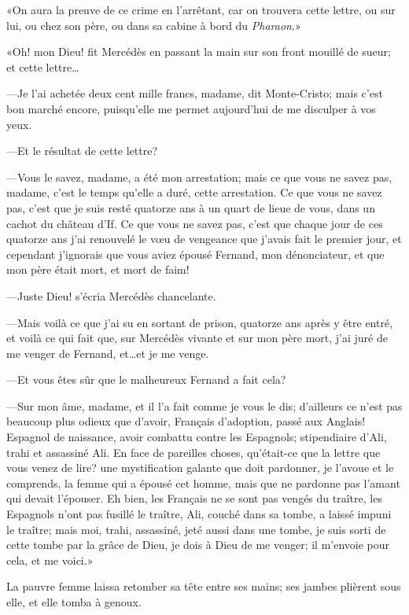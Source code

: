 «On aura la preuve de ce crime en l'arrêtant, car on trouvera cette lettre, ou sur lui, ou chez son père, ou dans sa cabine à bord du \textit{Pharaon}.» 

«Oh! mon Dieu! fit Mercédès en passant la main sur son front mouillé de sueur; et cette lettre\dots 

—Je l'ai achetée deux cent mille francs, madame, dit Monte-Cristo; mais c'est bon marché encore, puisqu'elle me permet aujourd'hui de me disculper à vos yeux. 

—Et le résultat de cette lettre? 

—Vous le savez, madame, a été mon arrestation; mais ce que vous ne savez pas, madame, c'est le temps qu'elle a duré, cette arrestation. Ce que vous ne savez pas, c'est que je suis resté quatorze ans à un quart de lieue de vous, dans un cachot du château d'If. Ce que vous ne savez pas, c'est que chaque jour de ces quatorze ans j'ai renouvelé le vœu de vengeance que j'avais fait le premier jour, et cependant j'ignorais que vous aviez épousé Fernand, mon dénonciateur, et que mon père était mort, et mort de faim! 

—Juste Dieu! s'écria Mercédès chancelante. 

—Mais voilà ce que j'ai su en sortant de prison, quatorze ans après y être entré, et voilà ce qui fait que, sur Mercédès vivante et sur mon père mort, j'ai juré de me venger de Fernand, et\dots et je me venge. 

—Et vous êtes sûr que le malheureux Fernand a fait cela? 

—Sur mon âme, madame, et il l'a fait comme je vous le dis; d'ailleurs ce n'est pas beaucoup plus odieux que d'avoir, Français d'adoption, passé aux Anglais! Espagnol de naissance, avoir combattu contre les Espagnols; stipendiaire d'Ali, trahi et assassiné Ali. En face de pareilles choses, qu'était-ce que la lettre que vous venez de lire? une mystification galante que doit pardonner, je l'avoue et le comprends, la femme qui a épousé cet homme, mais que ne pardonne pas l'amant qui devait l'épouser. Eh bien, les Français ne se sont pas vengés du traître, les Espagnols n'ont pas fusillé le traître, Ali, couché dans sa tombe, a laissé impuni le traître; mais moi, trahi, assassiné, jeté aussi dans une tombe, je suis sorti de cette tombe par la grâce de Dieu, je dois à Dieu de me venger; il m'envoie pour cela, et me voici.» 

La pauvre femme laissa retomber sa tête entre ses mains; ses jambes plièrent sous elle, et elle tomba à genoux. 

